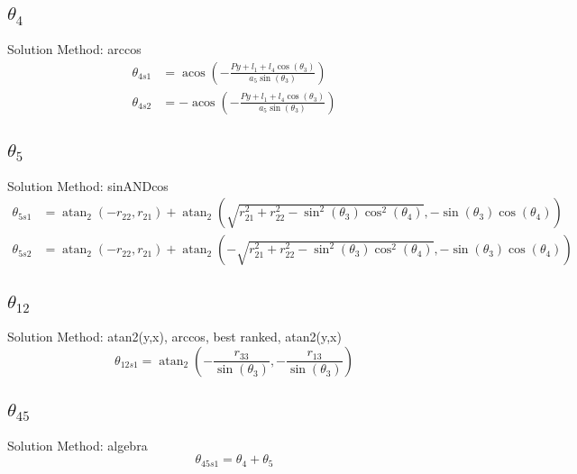 \documentclass[letterpaper]{article}
\begin{document}
\subsection{$\theta_{4}$ } 
Solution Method: arccos
\begin{align}
  \theta_{4s1} &= \operatorname{acos}{\left(- \frac{Py + l_{1} + l_{4} \cos{\left(\theta_{3} \right)}}{a_{5} \sin{\left(\theta_{3} \right)}} \right)} \\
  \theta_{4s2} &= - \operatorname{acos}{\left(- \frac{Py + l_{1} + l_{4} \cos{\left(\theta_{3} \right)}}{a_{5} \sin{\left(\theta_{3} \right)}} \right)} \end{align} 



\subsection{$\theta_{5}$ } 
Solution Method: sinANDcos
\begin{align}
  \theta_{5s1} &= \operatorname{atan}_{2}{\left(- r_{22},r_{21} \right)} + \operatorname{atan}_{2}{\left(\sqrt{r_{21}^{2} + r_{22}^{2} - \sin^{2}{\left(\theta_{3} \right)} \cos^{2}{\left(\theta_{4} \right)}},- \sin{\left(\theta_{3} \right)} \cos{\left(\theta_{4} \right)} \right)} \\
  \theta_{5s2} &= \operatorname{atan}_{2}{\left(- r_{22},r_{21} \right)} + \operatorname{atan}_{2}{\left(- \sqrt{r_{21}^{2} + r_{22}^{2} - \sin^{2}{\left(\theta_{3} \right)} \cos^{2}{\left(\theta_{4} \right)}},- \sin{\left(\theta_{3} \right)} \cos{\left(\theta_{4} \right)} \right)} \end{align} 



\subsection{$\theta_{12}$ } 
Solution Method: atan2(y,x), arccos, best ranked, atan2(y,x)
\begin{dmath} 
  \theta_{12s1} = \operatorname{atan}_{2}{\left(- \frac{r_{33}}{\sin{\left(\theta_{3} \right)}},- \frac{r_{13}}{\sin{\left(\theta_{3} \right)}} \right)} \end{dmath} 



\subsection{$\theta_{45}$ } 
Solution Method: algebra
\begin{dmath} 
  \theta_{45s1} = \theta_{4} + \theta_{5} \end{dmath} 
\end{document}
